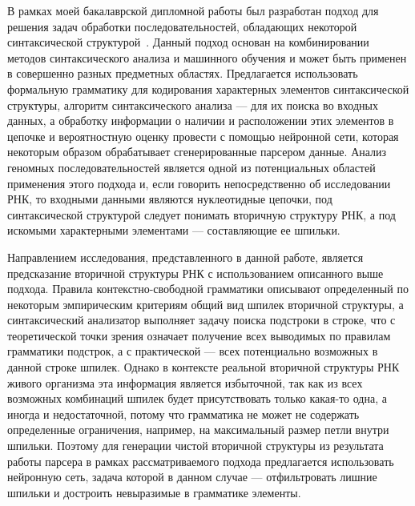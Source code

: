 В рамках моей бакалаврской дипломной работы был разработан подход для решения задач обработки последовательностей, обладающих некоторой синтаксической структурой~\cite{grigorev2019composition}. Данный подход основан на комбинировании методов синтаксического анализа и машинного обучения и может быть применен в совершенно разных предметных областях. Предлагается использовать формальную грамматику для кодирования характерных элементов синтаксической структуры, алгоритм синтаксического анализа --- для их поиска во входных данных, а обработку информации о наличии и расположении этих элементов в цепочке и вероятностную оценку провести с помощью нейронной сети, которая некоторым образом обрабатывает сгенерированные парсером данные. Анализ геномных последовательностей является одной из потенциальных областей применения этого подхода и, если говорить непосредственно об исследовании РНК, то входными данными являются нуклеотидные цепочки, под синтаксической структурой следует понимать вторичную структуру РНК, а под искомыми характерными элементами --- составляющие ее шпильки. 

Направлением исследования, представленного в данной работе, является предсказание вторичной структуры РНК с использованием описанного выше подхода. Правила контекстно-свободной грамматики описывают определенный по некоторым эмпирическим критериям общий вид шпилек вторичной структуры, а синтаксический анализатор выполняет задачу поиска подстроки в строке, что с теоретической точки зрения означает получение всех выводимых по правилам грамматики подстрок, а с практической --- всех потенциально возможных в данной строке шпилек. Однако в контексте реальной вторичной структуры РНК живого организма эта информация является избыточной, так как из всех возможных комбинаций шпилек будет присутствовать только какая-то одна, а иногда и недостаточной, потому что грамматика не может не содержать определенные ограничения, например, на максимальный размер петли внутри шпильки. Поэтому для генерации чистой вторичной структуры из результата работы парсера в рамках рассматриваемого подхода предлагается использовать нейронную сеть, задача которой в данном случае --- отфильтровать лишние шпильки и достроить невыразимые в грамматике элементы.